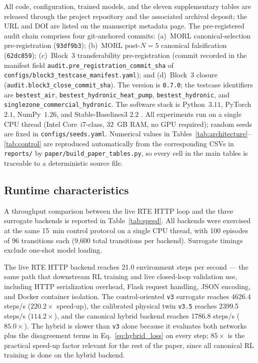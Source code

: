 All code, configuration, trained models, and the eleven supplementary
tables are released through the project repository and the associated
archival deposit; the URL and DOI are listed on the manuscript
metadata page. The pre-registered audit chain comprises four
git-anchored commits:
(a)~MORL canonical-selection pre-registration
(\texttt{93df9b3});
(b)~MORL post-$N{=}5$ canonical falsification
(\texttt{62dc859});
(c)~Block~3 transferability pre-registration
(commit recorded in the manifest field
\texttt{audit.pre\_registration\_commit\_sha} of
\texttt{configs/block3\_testcase\_manifest.yaml}); and
(d)~Block~3 closure
(\texttt{audit.block3\_close\_commit\_sha}).
The \boptest{} version is \texttt{0.7.0}; the testcase identifiers
are \texttt{bestest\_air}, \texttt{bestest\_hydronic\_heat\_pump},
\texttt{bestest\_hydronic}, and
\texttt{singlezone\_commercial\_hydronic}. The software stack is
Python~$3.11$, PyTorch~$2.1$, NumPy~$1.26$, and Stable-Baselines3
$2.2$ \citep{Raffin2021SB3}. All experiments run on a single CPU
thread (Intel Core~i7-class, $32$~GB RAM, no GPU required); random
seeds are fixed in \texttt{configs/seeds.yaml}. Numerical values in
Tables~\ref{tab:architecture}--\ref{tab:control} are reproduced
automatically from the corresponding CSVs in \texttt{reports/} by
\texttt{paper/build\_paper\_tables.py}, so every cell in the main
tables is traceable to a deterministic source file.

\subsection{Runtime characteristics}
\label{ssec:exp_runtime}

A throughput comparison between the live \boptest{} RTE HTTP loop and
the three surrogate backends is reported in Table~\ref{tab:speed}. All
backends were exercised at the same \SI{15}{\minute} control protocol
on a single CPU thread, with 100 episodes of 96 transitions each
(9{,}600 total transitions per backend). Surrogate timings exclude
one-shot model loading.

The live \boptest{} RTE HTTP backend reaches \num{21.0} environment
steps per second --- the same path that downstream RL training and live
closed-loop validation use, including HTTP serialization overhead,
Flask request handling, JSON encoding, and Docker container isolation.
The control-oriented \texttt{v3} surrogate reaches \num{4626.4} steps/s
($220.2\times$ speed-up), the calibrated physical twin \texttt{v3.5}
reaches \num{2399.5} steps/s ($114.2\times$), and the canonical hybrid
backend reaches \num{1786.8} steps/s ($85.0\times$). The hybrid is
slower than \texttt{v3} alone because it evaluates both networks plus
the disagreement terms in Eq.~\eqref{eq:hybrid_loss} on every step;
$85\times$ is the practical speed-up factor relevant for the rest of
the paper, since all canonical RL training is done on the hybrid
backend.

